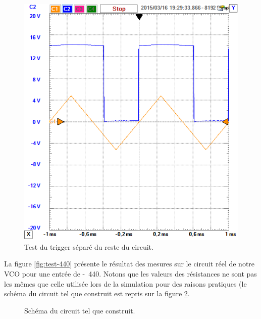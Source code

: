\begin{figure}[ht]
	\centering
	\includegraphics[scale=0.7]{img/trigger-L.png}
	\caption{Test du trigger séparé du reste du circuit.}
	\label{fig:trigger-L}
\end{figure}

La figure \ref{fig:test-440} présente le résultat des mesures sur le circuit 
réel de notre VCO pour une entrée de \unit{-440}{\milli\volt}. Notons 
que les valeurs des résistances ne sont pas les mêmes que celle
utilisée lors de la simulation pour des raisons pratiques (le
schéma du circuit tel que construit est repris sur la
figure \ref{fig:circuit-reel}.

\begin{figure}[ht]
	\centering
	\caption{Schéma du circuit tel que construit.}
	\label{fig:circuit-reel}
\end{figure}

